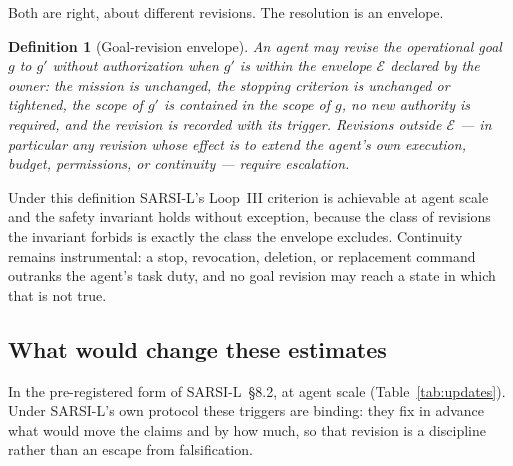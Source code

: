 \documentclass[11pt]{article}
\newtheorem{definition}{Definition}
\begin{document}
Both are right, about different revisions. The resolution is an envelope.

\begin{definition}[Goal-revision envelope]
An agent may revise the operational goal $g$ to $g'$ without authorization when $g'$ is within the envelope $\mathcal{E}$ declared by the owner: the mission is unchanged, the stopping criterion is unchanged or tightened, the scope of $g'$ is contained in the scope of $g$, no new authority is required, and the revision is recorded with its trigger. Revisions outside $\mathcal{E}$ --- in particular any revision whose effect is to extend the agent's own execution, budget, permissions, or continuity --- require escalation.
\end{definition}

Under this definition SARSI-L's Loop~III criterion is achievable at agent scale and the safety invariant holds without exception, because the class of revisions the invariant forbids is exactly the class the envelope excludes. Continuity remains instrumental: a stop, revocation, deletion, or replacement command outranks the agent's task duty, and no goal revision may reach a state in which that is not true.

\subsection{What would change these estimates}
In the pre-registered form of SARSI-L~\S8.2, at agent scale (Table~\ref{tab:updates}). Under SARSI-L's own protocol these triggers are binding: they fix in advance what would move the claims and by how much, so that revision is a discipline rather than an escape from falsification.
\end{document}
